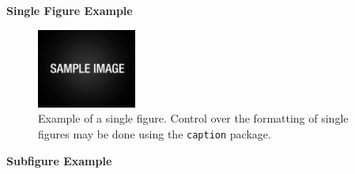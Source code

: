 \documentclass[12pt]{article}
\begin{document}
\noindent\textbf{Single Figure Example}

\begin{figure}[h]
	\begin{center}
		\includegraphics[width=3.25cm]{sample.pdf}
		\caption{Example of a single figure.  Control over the formatting of single figures may be done using the \texttt{caption} package.}
		\label{fig:singlefigure}
	\end{center}
\end{figure}

\noindent\textbf{Subfigure Example}
\end{document}
